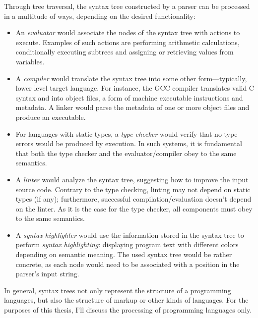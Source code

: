 \documentclass[UdineBachThesis,american,11pt,draft]{PhdThesis}
\begin{document}
  Through tree traversal, the syntax tree constructed by a parser can be
  processed in a multitude of ways, depending on the desired functionality:

  \begin{itemize}
    \item An \emph{evaluator} would associate the nodes of the syntax tree with
    actions to execute. Examples of such actions are performing arithmetic
    calculations, conditionally executing subtrees and assigning or retrieving
    values from variables.

    \item A \emph{compiler} would translate the syntax tree into some other
    form---typically, lower level target language. For instance, the GCC
    compiler translates valid C syntax and into object files, a form of machine
    executable instructions and metadata. A linker would parse the metadata of
    one or more object files and produce an executable.

    \item For languages with static types, a \emph{type checker} would verify
    that no type errors would be produced by execution. In such systems, it is
    fundamental that both the type checker and the evaluator/compiler obey to
    the same semantics.

    \item A \emph{linter} would analyze the syntax tree, suggesting how to
    improve the input source code. Contrary to the type checking, linting may
    not depend on static types (if any); furthermore, successful
    compilation/evaluation doesn't depend on the linter. As it is the case for
    the type checker, all components must obey to the same semantics.

    \item A \emph{syntax highlighter} would use the information stored in the
    syntax tree to perform \emph{syntax highlighting}: displaying program text
    with different colors depending on semantic meaning. The used syntax tree
    would be rather concrete, as each node would need to be associated with a
    position in the parser's input string.
  \end{itemize}

  In general, syntax trees not only represent the structure of a programming
  languages, but also the structure of markup or other kinds of languages. For
  the purposes of this thesis, I'll discuss the processing of programming
  languages only.
\end{document}
